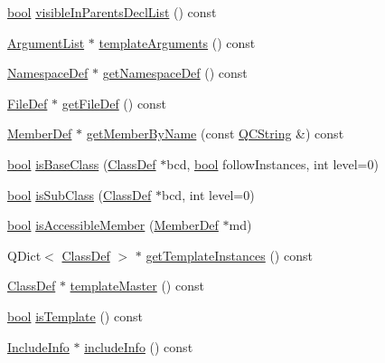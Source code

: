 \begin{DoxyCompactItemize}
\item 
\hyperlink{qglobal_8h_a1062901a7428fdd9c7f180f5e01ea056}{bool} \hyperlink{class_class_def_a825f7f143fb2b335646ffdc25ea59417}{visible\+In\+Parents\+Decl\+List} () const 
\item 
\hyperlink{class_argument_list}{Argument\+List} $\ast$ \hyperlink{class_class_def_a3ba3cce6c993005b394e616267f31b3c}{template\+Arguments} () const 
\item 
\hyperlink{class_namespace_def}{Namespace\+Def} $\ast$ \hyperlink{class_class_def_a5a827d9ad5603bfe4e193c2c9001cdc0}{get\+Namespace\+Def} () const 
\item 
\hyperlink{class_file_def}{File\+Def} $\ast$ \hyperlink{class_class_def_ac30c86b68f74495d90bc44bb5b432529}{get\+File\+Def} () const 
\item 
\hyperlink{class_member_def}{Member\+Def} $\ast$ \hyperlink{class_class_def_af8e55d262da3d357b7dceb154c145c84}{get\+Member\+By\+Name} (const \hyperlink{class_q_c_string}{Q\+C\+String} \&) const 
\item 
\hyperlink{qglobal_8h_a1062901a7428fdd9c7f180f5e01ea056}{bool} \hyperlink{class_class_def_a500d1c453352fa69a791749b2a5a2423}{is\+Base\+Class} (\hyperlink{class_class_def}{Class\+Def} $\ast$bcd, \hyperlink{qglobal_8h_a1062901a7428fdd9c7f180f5e01ea056}{bool} follow\+Instances, int level=0)
\item 
\hyperlink{qglobal_8h_a1062901a7428fdd9c7f180f5e01ea056}{bool} \hyperlink{class_class_def_a89449570106d125574aead5e6a7bee1e}{is\+Sub\+Class} (\hyperlink{class_class_def}{Class\+Def} $\ast$bcd, int level=0)
\item 
\hyperlink{qglobal_8h_a1062901a7428fdd9c7f180f5e01ea056}{bool} \hyperlink{class_class_def_ae41817cab4398dd47ada2ff077e88cd2}{is\+Accessible\+Member} (\hyperlink{class_member_def}{Member\+Def} $\ast$md)
\item 
Q\+Dict$<$ \hyperlink{class_class_def}{Class\+Def} $>$ $\ast$ \hyperlink{class_class_def_a40a4d62d34cfa2f075c58acf6477e67f}{get\+Template\+Instances} () const 
\item 
\hyperlink{class_class_def}{Class\+Def} $\ast$ \hyperlink{class_class_def_af6d871db00924a443ef14c86c830c0d9}{template\+Master} () const 
\item 
\hyperlink{qglobal_8h_a1062901a7428fdd9c7f180f5e01ea056}{bool} \hyperlink{class_class_def_a1cf3d48d5fdfce179f11d463d379d5f9}{is\+Template} () const 
\item 
\hyperlink{struct_include_info}{Include\+Info} $\ast$ \hyperlink{class_class_def_a5763cd498c14f7d942d7cf9feddef68b}{include\+Info} () const 

\end{DoxyCompactItemize}
